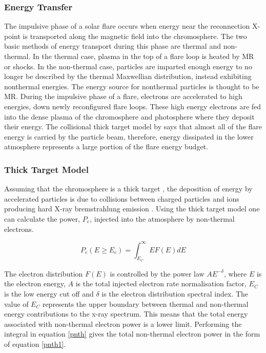 \subsubsection{Energy Transfer}
The impulsive phase of a solar flare occurs when energy near the reconnection X-point is transported along the magnetic field into the chromosphere. The two basic methods of energy transport during this phase are thermal and non-thermal. In the thermal case, plasma in the top of a flare loop is heated by MR or shocks. In the non-thermal case, particles are imparted enough energy to no longer be described by the thermal Maxwellian distribution, instead exhibiting nonthermal energies. The energy source for nonthermal particles is thought to be MR. During the impulsive phase of a flare, electrons are accelerated to high energies, down newly reconfigured flare loops. These high energy electrons are fed into the dense plasma of the chromosphere and photosphere where they deposit their energy. The collisional thick target model by \cite{1971SoPh...18..489B} says that almost all of the flare energy is carried by the particle beam, therefore, energy dissipated in the lower atmosphere represents a large portion of the flare energy budget.

\subsubsection{Thick Target Model} Assuming that the chromosphere is a thick target , the deposition of energy by accelerated particles is due to collisions between charged particles and ions producing hard X-ray bremstrahlung emission \citep{1967SvA....11..258K}. Using the thick target model \citep{1971SoPh...18..489B} one can calculate the power, $P_{e}$, injected into the atmosphere by non-thermal electrons.  
 
\begin{equation}\label{pnth}
P_{e}(E \geq E_{c}) = \int_{E_{C}}^{\infty} EF(E)dE
\end{equation}

The electron distribution $F(E)$ is controlled by the power law $AE^{-\delta}$, where $E$ is the electron energy, $A$ is the total injected electron rate normalisation factor, $E_{C}$ is the low energy cut off and $\delta$ is the electron distribution spectral index. The value of $E_{C}$ represents the upper boundary between thermal and non-thermal energy contributions to the x-ray spectrum. This means that the total energy associated with non-thermal electron power is a lower limit. Performing the integral in equation \ref{pnth} gives the total non-thermal electron power in the form of equation \ref{pnth1}.

